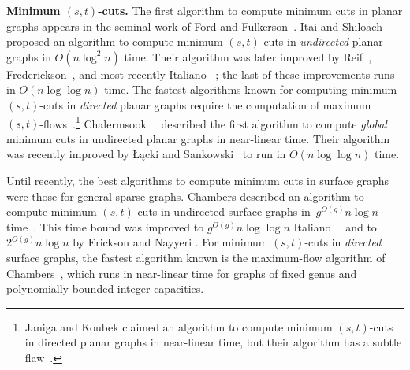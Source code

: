 \documentclass[twoside,leqno,twocolumn]{article}
\def\paragraph#1{\par\medskip\noindent\textbf{#1}}
\begin{document}
\paragraph{\boldmath Minimum $(s,t)$-cuts.}
The first algorithm to compute minimum cuts in planar graphs appears in the seminal work of Ford and Fulkerson~\cite{ff-mfn-56}.  Itai and Shiloach~\cite{is-mfpn-79} proposed an algorithm to compute minimum $(s,t)$-cuts in \emph{undirected} planar graphs in $O(n\log^2 n)$ time.  Their algorithm was later improved by Reif~\cite{r-mstcp-83}, Frederickson~\cite{f-faspp-87}, and most recently Italiano \etal~\cite{insw-iamcmf-11}; the last of these improvements runs in $O(n\log\log n)$ time.  The fastest algorithms known for computing minimum $(s,t)$-cuts in \emph{directed} planar graphs require the computation of maximum $(s,t)$-flows~\cite{b-epnfc-08, bk-amfdp-09}.\footnote{Janiga and Koubek \cite{jk-mcdpn-92} claimed an algorithm to compute minimum $(s,t)$-cuts in directed planar graphs in near-linear time, but their algorithm has a subtle flaw~\cite{kn-mcupg-11}.}  Chalermsook~\etal~\cite{cfn-dnlta-04} described the first algorithm to compute \emph{global} minimum cuts in undirected planar graphs in near-linear time.  Their algorithm was recently improved by Łącki and Sankowski~\cite{ls-mcsc-11} to run in $O(n\log\log n)$ time.

Until recently, the best algorithms to compute minimum cuts in surface graphs were those for general sparse graphs.  Chambers \etal described an algorithm to compute minimum $(s,t)$-cuts in undirected surface graphs in~$g^{O(g)} n \log n$ time~\cite{cen-mcshc-09}.  This time bound was improved to $g^{O(g)} n \log\log n$ Italiano~\etal~\cite{insw-iamcmf-11} and to $2^{O(g)}n\log n$ by Erickson and Nayyeri \cite{en-mcsnc-11}.  For minimum $(s,t)$-cuts in \emph{directed} surface graphs, the fastest algorithm known is the maximum-flow algorithm of Chambers\etal~\cite{cen-hfcc-09}, which runs in near-linear time for graphs of fixed genus and polynomially-bounded integer capacities.
\end{document}
